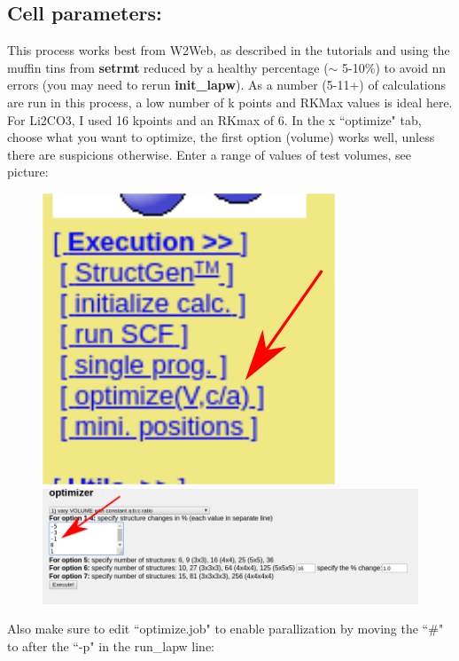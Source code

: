 \documentclass[12pt]{article}
\begin{document}
\subsection{Cell parameters:}
This process works best from W2Web, as described in the tutorials and using the muffin tins from \textbf{setrmt} reduced by a healthy percentage ($\sim$ 5-10\%) to avoid nn errors (you may need to rerun \textbf{init\_lapw}).    As  a number (5-11+) of calculations are run in this process, a low number of k points and RKMax values is ideal here. For Li2CO3, I used 16 kpoints and an RKmax of 6.   In the x ``optimize" tab, choose what you want to optimize, the first option (volume) works well, unless there are suspicions otherwise.  Enter a range of values of test volumes, see picture:

\begin{figure}[H]

\includegraphics[scale=0.3]{./images/vol_opt_menu.png}
~
\includegraphics[scale=0.3]{./images/vol_opt.png}



\end{figure}


Also make sure to edit ``optimize.job" to enable parallization by moving the ``\#" to after the ``-p" in the run\_lapw line: 
\end{document}
